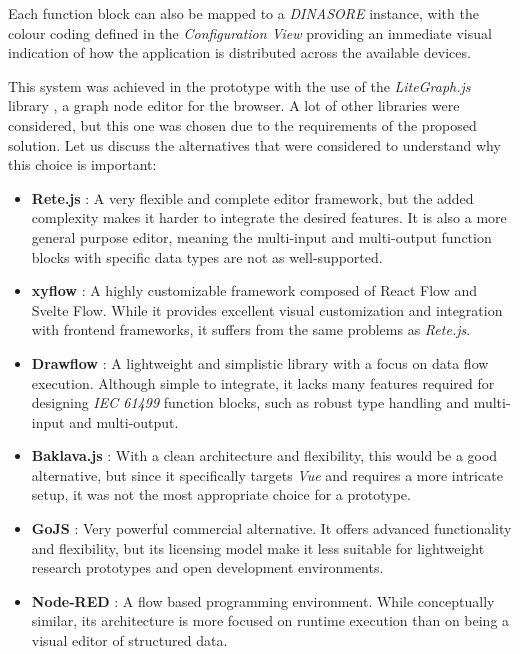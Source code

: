 Each function block can also be mapped to a \textit{DINASORE} instance, with the colour coding defined in the \textit{Configuration View} providing an immediate visual indication of how the application is distributed across the available devices.

This system was achieved in the prototype with the use of the \textit{LiteGraph.js} library \cite{noauthor_litegraphjs_nodate}, a graph node editor for the browser. A lot of other libraries were considered, but this one was chosen due to the requirements of the proposed solution. Let us discuss the alternatives that were considered to understand why this choice is important:

\begin{itemize}
  \item \textbf{Rete.js} \cite{noauthor_retejs_nodate}: A very flexible and complete editor framework, but the added complexity makes it harder to integrate the desired features. It is also a more general purpose editor, meaning the multi-input and multi-output function blocks with specific data types are not as well-supported.
  \item \textbf{xyflow} \cite{noauthor_node-based_nodate}: A highly customizable framework composed of React Flow and Svelte Flow. While it provides excellent visual customization and integration with frontend frameworks, it suffers from the same problems as \textit{Rete.js}.
  \item \textbf{Drawflow} \cite{soler_drawflow_2026}: A lightweight and simplistic library with a focus on data flow execution. Although simple to integrate, it lacks many features required for designing \textit{IEC 61499} function blocks, such as robust type handling and multi-input and multi-output.
  \item \textbf{Baklava.js} \cite{noauthor_baklavajs_nodate}: With a clean architecture and flexibility, this would be a good alternative, but since it specifically targets \textit{Vue} and requires a more intricate setup, it was not the most appropriate choice for a prototype.
  \item \textbf{GoJS} \cite{noauthor_gojs_nodate}: Very powerful commercial alternative. It offers advanced functionality and flexibility, but its licensing model make it less suitable for lightweight research prototypes and open development environments.
  \item \textbf{Node-RED} \cite{noauthor_low-code_nodate}: A flow based programming environment. While conceptually similar, its architecture is more focused on runtime execution than on being a visual editor of structured data.
\end{itemize}

